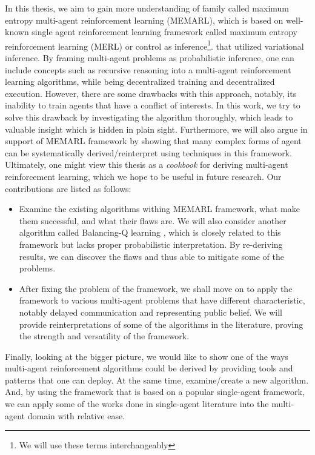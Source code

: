 In this thesis, we aim to gain more understanding of family called maximum entropy multi-agent reinforcement learning (MEMARL), which is based on well-known single agent reinforcement learning framework called maximum entropy reinforcement learning (MERL) or control as inference\footnote{We will use these terms interchangeably}. that utilized variational inference. By framing multi-agent problems as probabilistic inference, one can include concepts such as recursive reasoning \cite{wen2019probabilistic, wen2019multi} into a multi-agent reinforcement learning algorithms, while being decentralized training and decentralized execution. However, there are some drawbacks with this approach, notably, its inability to train agents that have a conflict of interests. In this work, we try to solve this drawback by investigating the algorithm thoroughly, which leads to valuable insight which is hidden in plain sight. Furthermore, we will also argue in support of MEMARL framework by showing that many complex forms of agent can be systematically derived/reinterpret using techniques in this framework. Ultimately, one might view this thesis as a \textit{cookbook} for deriving multi-agent reinforcement learning, which we hope to be useful in future research. Our contributions are listed as follows:
\begin{itemize}
    \item Examine the existing algorithms withing MEMARL framework, what make them successful, and what their flaws are. We will also consider another algorithm called Balancing-Q learning \cite{grau2018balancing}, which is closely related to this framework but lacks proper probabilistic interpretation. By re-deriving results, we can discover the flaws and thus able to mitigate some of the problems. 
    \item After fixing the problem of the framework, we shall move on to apply the framework to various multi-agent problems that have different characteristic, notably delayed communication and representing public belief. We will provide reinterpretations of some of the algorithms in the literature, proving the strength and versatility of the framework.
\end{itemize}
Finally, looking at the bigger picture, we would like to show one of the ways multi-agent reinforcement algorithms could be derived by providing tools and patterns that one can deploy. At the same time, examine/create a new algorithm. And, by using the framework that is based on a popular single-agent framework, we can apply some of the works done in single-agent literature into the multi-agent domain with relative ease. 